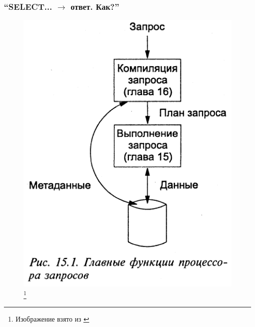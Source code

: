 \documentclass{beamer}
\begin{document}
\begin{frame}
\frametitle{``SELECT... $\rightarrow$ ответ. Как?''}

\begin{figure}[htb]
\includegraphics[width=\textwidth,height=0.8\textheight,keepaspectratio]{query-processor.png} 
\footnote{\tiny{Изображение взято из \cite{Ulman2004}}}
\end{figure}

\end{frame}
\end{document}
